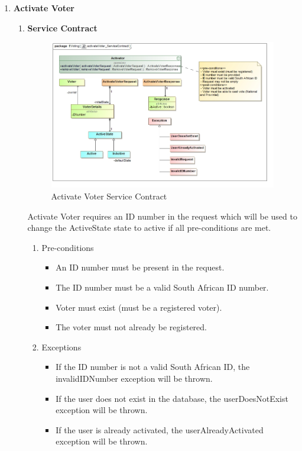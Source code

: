 \begin{enumerate}
	\item \textbf{Activate Voter}
		\begin{enumerate}
			\item \textbf{Service Contract}
				\begin{figure}[H]
					\centering
					\includegraphics[width=0.75\linewidth]{../Images/Activator/ServiceContract/activateVoter_ServiceContract.jpg}
					\caption{Activate Voter Service Contract}
				\end{figure}
				
				Activate Voter requires an ID number in the request which will be used to change the ActiveState state to active if all pre-conditions are met.
				\newline				
				
				\begin{enumerate}
					\item Pre-conditions
					\begin{itemize}
						\item An ID number must be present in the request.
						\item The ID number must be a valid South African ID number.
						\item Voter must exist (must be a registered voter).
						\item The voter must not already be registered.
					\end{itemize}
					
					\item Exceptions
					\begin{itemize}
						\item If the ID number is not a valid South African ID, the invalidIDNumber exception will be thrown.
						\item If the user does not exist in the database, the userDoesNotExist exception will be thrown.
						\item If the user is already activated, the userAlreadyActivated exception will be thrown.
					\end{itemize}
					

\end{enumerate}
\end{enumerate}
\end{enumerate}
